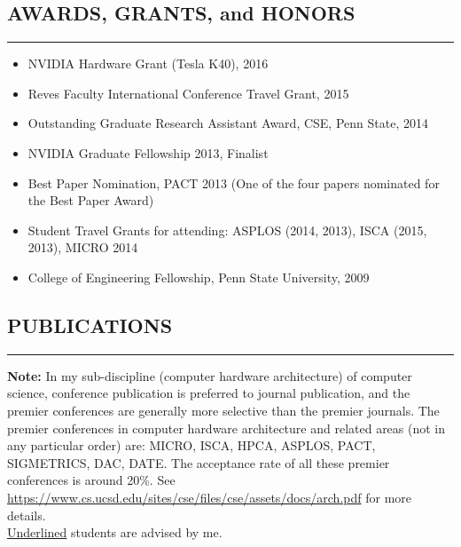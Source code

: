 \documentclass[10pt,a4]{article}
\begin{document}
\subsection*{AWARDS, GRANTS, and HONORS}
\hrule
\vspace{0.2cm}
\begin{itemize}
\item  NVIDIA Hardware Grant (Tesla K40), 2016 
\item  Reves Faculty International Conference Travel Grant, 2015 
\item  Outstanding Graduate Research Assistant Award, CSE, Penn State, 2014 
\item  NVIDIA Graduate Fellowship 2013, Finalist 
\item  Best Paper Nomination, PACT 2013 (One of the four papers nominated for the Best Paper Award) 
\item  Student Travel Grants for attending: ASPLOS (2014, 2013), ISCA (2015, 2013), MICRO 2014 
\item  College of Engineering Fellowship, Penn State University, 2009 
\end{itemize}

\subsection*{PUBLICATIONS}
\hrule
\vspace{0.2cm}
{\bf Note:} In my sub-discipline (computer hardware architecture) of computer science, conference publication 
is preferred to journal publication, and the premier conferences are generally more selective than the premier journals. 
The premier conferences in computer hardware architecture and related areas (not in any particular order)
are: MICRO, ISCA, HPCA, ASPLOS, PACT, SIGMETRICS, DAC, DATE. The
acceptance rate of all these premier conferences is around 20\%. 
See \url{https://www.cs.ucsd.edu/sites/cse/files/cse/assets/docs/arch.pdf} for more details.  \\
 
\underline{Underlined} students are advised by me. %
\end{document}
